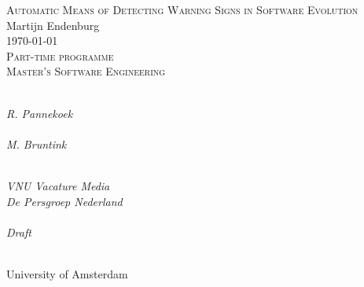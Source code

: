 \documentclass[9pt, a4paper, portrait]{report}
\title{\bf{\theTitle}}
\author{\theAuthor}
\newcommand{\theTitle}{Automatic Means of Detecting Warning Signs in Software
Evolution}
\newcommand{\theAuthor}{Martijn Endenburg}
\begin{document}
\begin{titlepage}
\begin{center}

\vspace*{2cm}

{ \huge \textsc{\theTitle} \\[0.6cm] }
{ \large \textsc \theAuthor \\[2cm] }
{ \textsc \today \\[0.2cm] }
{ \large \textsc{Part-time programme \\ Master's Software Engineering} \\[2cm] }

\begin{minipage}[t]{7cm}
\begin{flushleft}
\\
\emph{R. Pannekoek}\\[1.2cm]

\\
\emph{M. Bruntink}
\end{flushleft}
\end{minipage}
\hfill
\begin{minipage}[t]{7cm}
\begin{flushright}
\\
\emph{VNU Vacature Media \\ De Persgroep Nederland}\\[1.2cm]

\\
\emph{Draft}
\end{flushright}
\end{minipage}\\[2cm]

{ \Large \textsc University of Amsterdam }

\end{center}
\end{titlepage}

\tableofcontents


\end{document}
